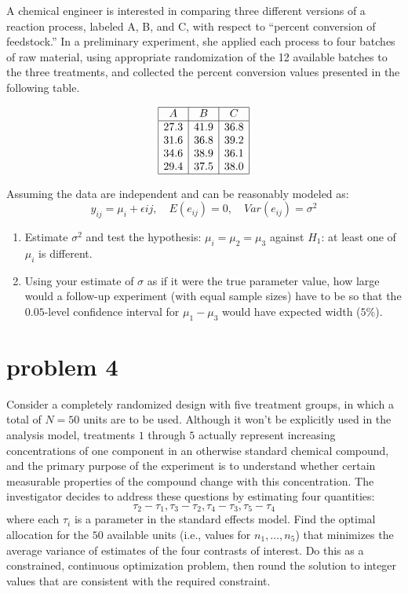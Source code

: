 \documentclass{article}
\begin{document}
A chemical engineer is interested in comparing three different versions of a reaction process, labeled
A, B, and C, with respect to “percent conversion of feedstock.” In a preliminary experiment, she
applied each process to four batches of raw material, using appropriate randomization of the 12
available batches to the three treatments, and collected the percent conversion values presented in
the following table.

$$
	\begin{array}{|c|c|c|}
		\hline
		A    & B    & C    \\
		\hline
		27.3 & 41.9 & 36.8 \\
		31.6 & 36.8 & 39.2 \\
		34.6 & 38.9 & 36.1 \\
		29.4 & 37.5 & 38.0 \\
		\hline
	\end{array}
$$

Assuming the data are independent and can be reasonably modeled as:
$$
	y_{ij}= \mu_i + \epsilon{ij}, \quad E(e_{ij})=0, \quad Var(e_{ij})= \sigma^2
$$
\begin{enumerate}
	\item Estimate $\sigma^2$ and test the hypothesis: $\mu_i = \mu_2 = \mu_3$ against $H_1$: at least one of $\mu_i$ is different.
	\item Using your estimate of $\sigma$ as if it were the true parameter value, how large would a follow-up experiment
	      (with equal sample sizes) have to be so that the $0.05$-level confidence interval for $\mu_1 - \mu_3$ would have expected width ($5\%$).
\end{enumerate}


\section{problem 4}
Consider a completely randomized design with five treatment groups, in which a total of $N = 50$
units are to be used. Although it won’t be explicitly used in the analysis model, treatments $1$
through $5$ actually represent increasing concentrations of one component in an otherwise standard
chemical compound, and the primary purpose of the experiment is to understand whether certain
measurable properties of the compound change with this concentration. The investigator decides
to address these questions by estimating four quantities:
$$
	\tau_2 - \tau_1,\tau_3-\tau_2,\tau_4-\tau_3,\tau_5-\tau_4
$$
where each $\tau_i$ is a parameter in the standard effects model. Find the optimal allocation for the $50$
available units (i.e., values for $n_1,\ldots , n_5$) that minimizes the average variance of estimates of the
four contrasts of interest. Do this as a constrained, continuous optimization problem, then round
the solution to integer values that are consistent with the required constraint.
\end{document}
